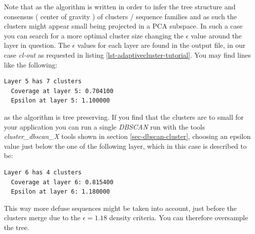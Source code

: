 Note that as the algorithm is written in order to infer the tree
structure and consensus ( center of gravity ) of clusters / sequence
families and as such the clusters might appear small being projected
in a PCA subspace. In
such a case you can search for a more optimal cluster size changing the
$\epsilon$ value around the layer in question. The $\epsilon$ values
for each layer are found
in the output file, in our case \emph{cl-out} as requested in listing
\ref{lst-adaptivecluster-tutorial}. You may find lines like the
following:
\begin{lstlisting}
Layer 5 has 7 clusters
  Coverage at layer 5: 0.704100
  Epsilon at layer 5: 1.100000
\end{lstlisting}
as the algorithm is tree preserving. If you find that the
clusters are to small for your application you can run a single
\emph{DBSCAN} run
\cite{dbscan} with the tools \emph{cluster\_dbscan\_X} tools
shown in section \ref{sec-dbscan-cluster},
choosing an epsilon value just below the one of the following layer,
which in this case is described to be:
\begin{lstlisting}
Layer 6 has 4 clusters
  Coverage at layer 6: 0.815400
  Epsilon at layer 6: 1.180000
\end{lstlisting}
This way more defuse sequences might be taken into account, just
before the clusters merge due to the $\epsilon=1.18$ density
criteria. You can therefore oversample the tree.

